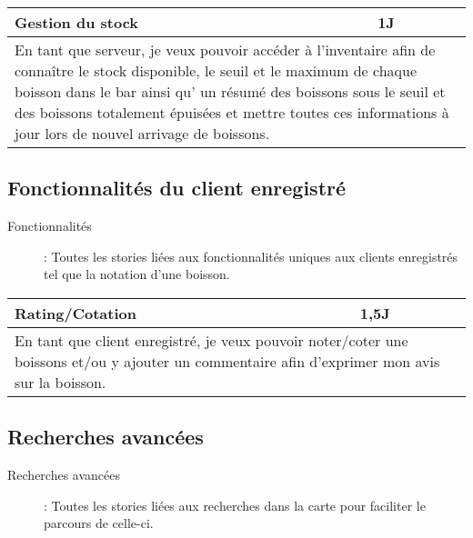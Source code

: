 \begin{center}
	\vspace{1cm}
	
	\begin{tabular}{ll}
		\hline
			\multicolumn{1}{|p{14cm}|}{Gestion du stock} & \multicolumn{1}{p{0.7cm}|}{1J}\\ 
		\hline
			\multicolumn{2}{|p{15cm}|}{En tant que serveur, je veux pouvoir accéder à l'inventaire
			afin de connaître le stock disponible, le seuil et le maximum de chaque boisson dans
			le bar ainsi qu' un résumé des boissons sous le seuil et des boissons totalement
			épuisées et mettre toutes ces informations à jour lors de nouvel arrivage de boissons.} \\
		\hline
	\end{tabular}
\end{center}

\subsection{Fonctionnalités du client enregistré}
\begin{description}
	\item[Fonctionnalités] : Toutes les stories liées aux fonctionnalités uniques aux clients enregistrés tel que la notation d'une boisson.
\end{description}

\begin{center}
	\begin{tabular}{ll}
		\hline
			\multicolumn{1}{|p{14cm}|}{Rating/Cotation} & \multicolumn{1}{p{0.7cm}|}{1,5J} \\ 
		\hline
			\multicolumn{2}{|p{15cm}|}{En tant que client enregistré, je veux pouvoir
			noter/coter une boissons et/ou y ajouter un commentaire afin d'exprimer mon avis sur la boisson.} \\
		\hline
	\end{tabular}
\end{center}

\subsection{Recherches avancées}
\begin{description}
	\item[Recherches avancées] : Toutes les stories liées aux recherches dans la carte pour faciliter le parcours de celle-ci.
\end{description}

